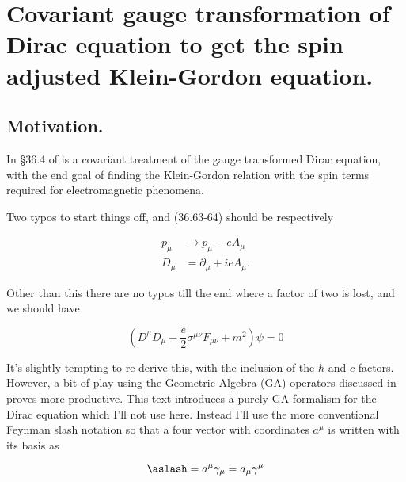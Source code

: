%
%

\chapter{Covariant gauge transformation of Dirac equation to get the spin adjusted Klein-Gordon equation.}
\label{chap:diracCovariant}
{}
\date{Sept 1, 2011}

\beginArtWithToc

\section{Motivation.}

In \S 36.4 of \cite{desai2009quantum} is a covariant treatment of the gauge transformed Dirac equation, with the end goal of finding the Klein-Gordon relation with the spin terms required for electromagnetic phenomena.

Two typos to start things off, and (36.63-64) should be respectively

\begin{align}\label{eqn:diracCovariant:10}
p_\mu &\rightarrow p_\mu - e A_\mu \\
D_\mu &= \partial_\mu + i e A_\mu.
\end{align}

Other than this there are no typos till the end where a factor of two is lost, and we should have

\begin{equation}\label{eqn:diracCovariant:30}
\left( D^\mu D_\mu - \frac{e}{2} \sigma^{\mu \nu} F_{\mu \nu} + m^2 \right) \psi = 0
\end{equation}

It's slightly tempting to re-derive this, with the inclusion of the $\hbar$ and $c$ factors.  However, a bit of play using the Geometric Algebra (GA) operators discussed in \cite{doran2003gap} proves more productive.  This text introduces a purely GA formalism for the Dirac equation which I'll not use here.  Instead I'll use the more conventional Feynman slash notation so that a four vector with coordinates $a^\mu$ is written with its basis as

\begin{equation}\label{eqn:diracCovariant:50}
\aslash = a^\mu \gamma_\mu = a_\mu \gamma^\mu
\end{equation}

